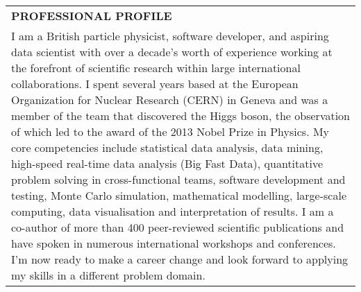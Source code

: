 \begin{longtable}{p{}}
\textcolor{color1}{\bf PROFESSIONAL PROFILE}\\
\arrayrulecolor{color1}
\toprule

I am a British particle physicist, software developer, and aspiring data scientist with over a decade's worth of experience working at the forefront of scientific research within large international collaborations. I spent several years based at the European Organization for Nuclear Research (CERN) in Geneva and was a member of the team that discovered the Higgs boson, the observation of which led to the award of the 2013 Nobel Prize in Physics. My core competencies include statistical data analysis, data mining, high-speed real-time data analysis (Big Fast Data), quantitative problem solving in cross-functional teams, software development and testing, Monte Carlo simulation, mathematical modelling, large-scale computing, data visualisation and interpretation of results. I am a co-author of more than 400 peer-reviewed scientific publications and have spoken in numerous international workshops and conferences. I'm now ready to make a career change and look forward to applying my skills in a different problem domain.


\end{longtable}


